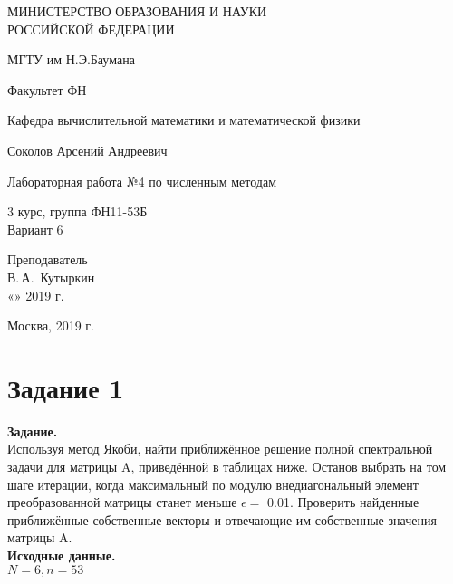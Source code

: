 \documentclass[14pt,a4paper]{scrartcl}
\begin{document}
	\begin{titlepage}
	\begin{center}
		\large
		МИНИСТЕРСТВО ОБРАЗОВАНИЯ И НАУКИ\\ РОССИЙСКОЙ ФЕДЕРАЦИИ
		
		\vspace{0.5cm}
		
		МГТУ им Н.Э.Баумана
		\vspace{0.25cm}
		
		Факультет ФН
		
		Кафедра вычислительной математики и математической физики
		\vfill
		
		
		Соколов Арсений Андреевич\\
		\vfill
		
		
		{\LARGE Лабораторная работа №4 по численным методам\\[2mm]
		}
		\bigskip
		
		3 курс, группа ФН11-53Б\\
		Вариант 6
	\end{center}
	\vfill
	
	\newlength{\ML}
	\hfill\begin{minipage}{0.4\textwidth}
		Преподаватель\\
		\underline{\hspace{3cm}} В.\,А.~Кутыркин\\
		«\underline{\hspace{0.7cm}}» \underline{\hspace{1.71cm}} 2019 г.
	\end{minipage}%
	\bigskip
	
	
	\vfill
	
	\begin{center}
		Москва, 2019 г.
	\end{center}
\end{titlepage}

\section*{Задание 1}
\textbf{Задание.}\\
Используя метод Якоби, найти приближённое решение полной спектральной задачи для матрицы A, приведённой в таблицах ниже. Останов выбрать на том шаге итерации, когда максимальный по модулю внедиагональный элемент преобразованной матрицы станет меньше $\epsilon = $ 0.01. Проверить найденные приближённые собственные векторы и отвечающие им собственные значения матрицы A.\\
\textbf{Исходные данные.}\\
$N = 6, n = 53$
\end{document}
